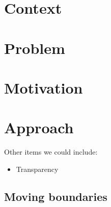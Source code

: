 \documentclass[a0,landscape]{a0poster}
\begin{document}
\begin{multicols}{3}
\section*{Context}





\color{DarkRed}
\section*{Problem}


\color{Black}




\section*{Motivation}




\vfill\null
\columnbreak




\section*{Approach}
Other items we could include:
\begin{itemize}[leftmargin=2cm]
	\item Transparency
\end{itemize}

\color{MidnightBlue}
\subsection*{Moving boundaries}
\color{Black}


\end{multicols}
\end{document}
